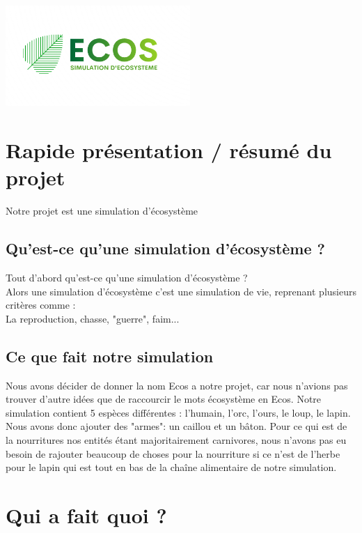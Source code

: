\documentclass[a4paper, 11pt]{article}
\title{}
\author{CHAMPENOIS Brandon \textsc{G5B} \\ BONVARLET Bastien \textsc{G5B} \\ MASSON Joris \textsc{G5B} }
\begin{document}
\maketitle
\centerline{\includegraphics[width = 7cm]{images/ecos.png}}
\tableofcontents
\newpage

\section{Rapide présentation / résumé du projet}
Notre projet est une simulation d'écosystème\\

\subsection*{Qu'est-ce qu'une simulation d'écosystème ?}
Tout d'abord qu'est-ce qu'une simulation d'écosystème ?\\
Alors une simulation d'écosystème c'est une simulation de vie, reprenant plusieurs critères comme :\\
La reproduction, chasse, "guerre", faim...\\

\subsection{Ce que fait notre simulation}
Nous avons décider de donner la nom Ecos a notre projet, car nous n'avions pas trouver d'autre idées que de raccourcir le mots écosystème en Ecos. Notre simulation contient 5 espèces différentes : l'humain, l'orc, l'ours, le loup, le lapin. Nous avons donc ajouter des "armes": un caillou et un bâton. Pour ce qui est de la nourritures nos entités étant majoritairement carnivores, nous n'avons pas eu besoin de rajouter beaucoup de choses pour la nourriture si ce n'est de l'herbe pour le lapin qui est tout en bas de la chaîne alimentaire de notre simulation.\\
\newpage

\section{Qui a fait quoi ?}
\end{document}
